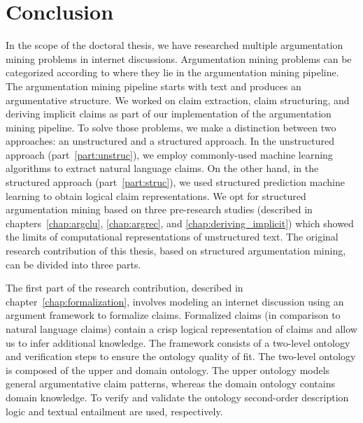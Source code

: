 \chapter{Conclusion}
\label{chap:conclusion}


In the scope of the doctoral thesis, we have researched multiple argumentation
mining problems in internet discussions.  Argumentation mining
problems can be categorized according to where they lie in the argumentation
mining pipeline. The argumentation mining pipeline starts with text and
produces an argumentative structure. 
We worked on claim extraction, claim
structuring, and deriving implicit claims as part of our implementation of the
argumentation mining pipeline. To solve those problems, we make a distinction
between two approaches: an unstructured and a structured approach. In the
unstructured approach (part~\ref{part:unstruc}), we employ commonly-used machine
learning algorithms to extract natural language claims. On the other hand, in
the structured approach (part~\ref{part:struc}), we used structured prediction
machine learning to obtain logical claim representations. 
We opt for structured argumentation mining based on three pre-research studies
(described in chapters~\ref{chap:argclu}, \ref{chap:argrec}, and
\ref{chap:deriving_implicit}) which showed the limits of computational
representations of unstructured text.  
The original research contribution of this thesis, based on 
structured argumentation mining, can be divided into three parts. 

The first part of the research contribution, described in
chapter~\ref{chap:formalization}, involves modeling an internet discussion using an
argument framework to formalize claims.  
Formalized claims (in comparison to natural language claims) contain a crisp
logical representation of claims and allow us to infer additional knowledge. 
The framework consists of a two-level
ontology and verification steps to ensure the ontology quality of fit.  The
two-level ontology is composed of the upper and domain ontology.  The upper
ontology models general argumentative claim patterns, whereas the domain
ontology contains domain knowledge. To verify and validate the ontology
second-order description logic and textual entailment are used, respectively. 

